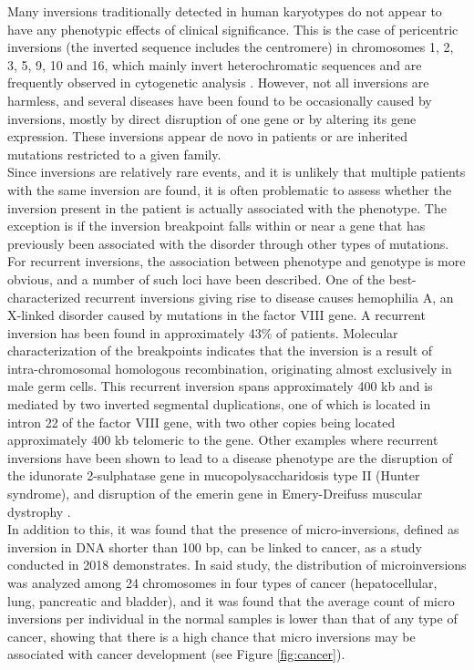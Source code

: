 Many inversions traditionally detected in human karyotypes do not appear to have any phenotypic effects of clinical significance. This is the case of pericentric inversions (the inverted sequence includes the centromere) in chromosomes 1, 2, 3, 5, 9, 10 and 16, which mainly invert heterochromatic sequences and are frequently observed in cytogenetic analysis \cite{puig_human_2015}. However, not all inversions are harmless, and several diseases have been found to be occasionally caused by inversions, mostly by direct disruption of one gene or by altering its gene expression. These inversions appear de novo in patients or are inherited mutations restricted to a given family. \\
Since inversions are relatively rare events, and it is unlikely that multiple patients with the same inversion are found, it is often problematic to assess whether the inversion present in the patient is actually associated with the phenotype. The exception is if the inversion breakpoint falls within or near a gene that has previously been associated with the disorder through other types of mutations. For recurrent inversions, the association between phenotype and genotype is more obvious, and a number of such loci have been described. One of the best-characterized recurrent inversions giving rise to disease causes hemophilia A, an X-linked disorder caused by mutations in the factor VIII gene. A recurrent inversion has been found in approximately 43\% of patients.
Molecular characterization of the breakpoints indicates that the inversion is a result of intra-chromosomal homologous recombination, originating almost exclusively in male germ cells. This recurrent inversion spans approximately 400 kb and is mediated by two inverted segmental duplications, one of which is located in intron 22 of the factor VIII gene, with two other copies being located approximately 400 kb telomeric to the gene. Other examples where recurrent inversions have been shown to lead to a disease phenotype are the disruption of the idunorate 2-sulphatase gene in mucopolysaccharidosis type II (Hunter syndrome), and disruption of the emerin gene in Emery-Dreifuss muscular dystrophy \cite{feuk_inversion_2010}. \\
In addition to this, it was found that the presence of micro-inversions, defined as inversion in DNA shorter than 100 bp, can be linked to cancer, as a study conducted in 2018 \cite{qu_micro-inversions_2018} demonstrates. In said study, the distribution of microinversions was analyzed among 24 chromosomes in four types of cancer (hepatocellular, lung, pancreatic and bladder), and it was found that the average count of micro inversions per individual in the normal samples is lower than that of any type of cancer, showing that there is a high chance that micro inversions may be associated with cancer development (see Figure \ref{fig:cancer}).

